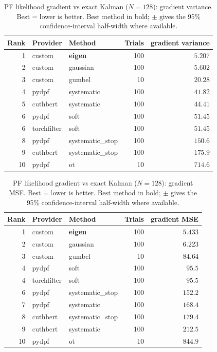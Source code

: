 \begin{table}[!htbp]
\centering
\small
\caption{PF likelihood gradient vs exact Kalman ($N=128$): gradient variance. Best = lower is better. Best method in bold; $\pm$ gives the 95\% confidence-interval half-width where available.}
\label{tab:pf-likelihood-gradient-vs-exact-kalman-gradient-variance}
\begin{tabular}{rllrr}
\toprule
Rank & Provider & Method & Trials & gradient variance \\
\midrule
1 & custom & \textbf{eigen} & 100 & $\mathbf{5.207}$ \\
2 & custom & gaussian & 100 & $5.602$ \\
3 & custom & gumbel & 10 & $20.28$ \\
4 & pydpf & systematic & 100 & $41.82$ \\
5 & cuthbert & systematic & 100 & $44.41$ \\
6 & pydpf & soft & 100 & $51.45$ \\
6 & torchfilter & soft & 100 & $51.45$ \\
8 & pydpf & systematic\_stop & 100 & $150.6$ \\
9 & cuthbert & systematic\_stop & 100 & $175.9$ \\
10 & pydpf & ot & 10 & $714.6$ \\
\bottomrule
\end{tabular}
\end{table}

\begin{table}[!htbp]
\centering
\small
\caption{PF likelihood gradient vs exact Kalman ($N=128$): gradient MSE. Best = lower is better. Best method in bold; $\pm$ gives the 95\% confidence-interval half-width where available.}
\label{tab:pf-likelihood-gradient-vs-exact-kalman-gradient-mse}
\begin{tabular}{rllrr}
\toprule
Rank & Provider & Method & Trials & gradient MSE \\
\midrule
1 & custom & \textbf{eigen} & 100 & $\mathbf{5.433}$ \\
2 & custom & gaussian & 100 & $6.223$ \\
3 & custom & gumbel & 10 & $84.64$ \\
4 & pydpf & soft & 100 & $95.5$ \\
4 & torchfilter & soft & 100 & $95.5$ \\
6 & pydpf & systematic\_stop & 100 & $152.2$ \\
7 & pydpf & systematic & 100 & $168.4$ \\
8 & cuthbert & systematic\_stop & 100 & $179.4$ \\
9 & cuthbert & systematic & 100 & $212.5$ \\
10 & pydpf & ot & 10 & $844.9$ \\
\bottomrule
\end{tabular}
\end{table}

